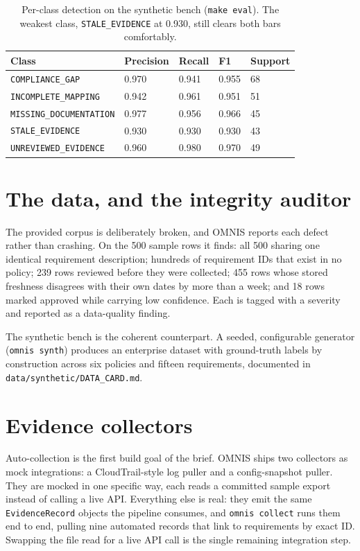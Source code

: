 \documentclass[11pt]{article}
\newcommand{\code}[1]{\texttt{\small #1}}
\begin{document}
\begin{table}[H]
\centering
\sffamily\small
\begin{tabularx}{\linewidth}{@{}Xllll@{}}
\toprule
Class & Precision & Recall & F1 & Support \\
\midrule
\code{COMPLIANCE\_GAP} & 0.970 & 0.941 & 0.955 & 68 \\
\code{INCOMPLETE\_MAPPING} & 0.942 & 0.961 & 0.951 & 51 \\
\code{MISSING\_DOCUMENTATION} & 0.977 & 0.956 & 0.966 & 45 \\
\code{STALE\_EVIDENCE} & 0.930 & 0.930 & 0.930 & 43 \\
\code{UNREVIEWED\_EVIDENCE} & 0.960 & 0.980 & 0.970 & 49 \\
\bottomrule
\end{tabularx}
\caption{Per-class detection on the synthetic bench (\code{make eval}). The weakest class,
\code{STALE\_EVIDENCE} at 0.930, still clears both bars comfortably.}
\end{table}

\section{The data, and the integrity auditor}

The provided corpus is deliberately broken, and OMNIS reports each defect rather than
crashing. On the 500 sample rows it finds: all 500 sharing one identical requirement
description; hundreds of requirement IDs that exist in no policy; 239 rows reviewed before
they were collected; 455 rows whose stored freshness disagrees with their own dates by
more than a week; and 18 rows marked approved while carrying low confidence. Each is
tagged with a severity and reported as a data-quality finding.

The synthetic bench is the coherent counterpart. A seeded, configurable generator
(\code{omnis synth}) produces an enterprise dataset with ground-truth labels by
construction across six policies and fifteen requirements, documented in
\code{data/synthetic/DATA\_CARD.md}.

\section{Evidence collectors}\label{sec:collectors}

Auto-collection is the first build goal of the brief. OMNIS ships two collectors as mock
integrations: a CloudTrail-style log puller and a config-snapshot puller. They are mocked
in one specific way, each reads a committed sample export instead of calling a live API.
Everything else is real: they emit the same \code{EvidenceRecord} objects the pipeline
consumes, and \code{omnis collect} runs them end to end, pulling nine automated records
that link to requirements by exact ID. Swapping the file read for a live API call is the
single remaining integration step.
\end{document}
